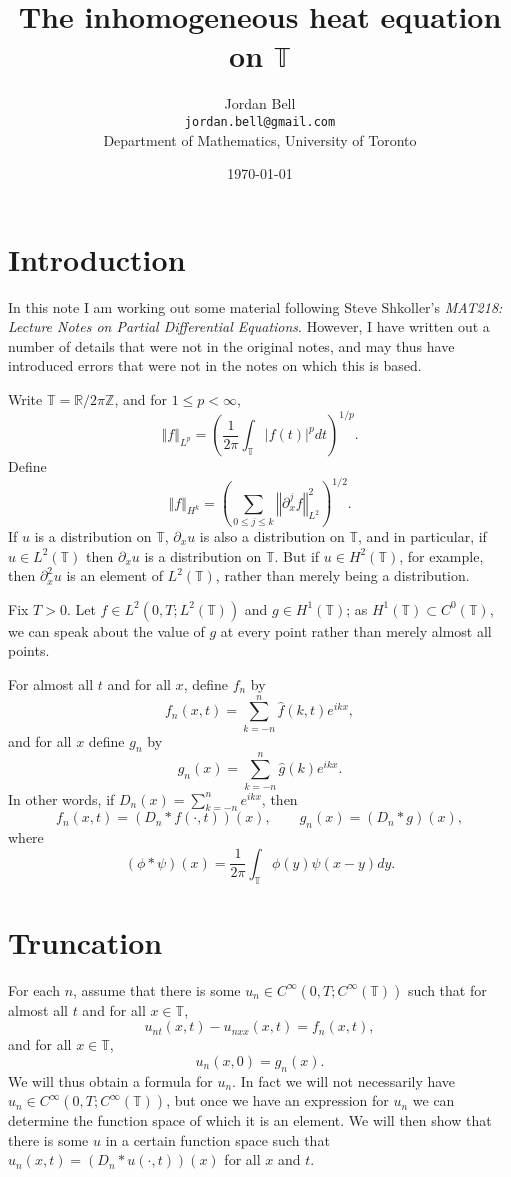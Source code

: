\documentclass{article}
\newcommand{\norm}[1]{\left\Vert #1 \right\Vert}
\begin{document}
\title{The inhomogeneous heat equation on $\mathbb{T}$}
\author{Jordan Bell\\ \texttt{jordan.bell@gmail.com}\\Department of Mathematics, University of Toronto}
\date{\today}

\maketitle
\section{Introduction}
In this note I am working out some material following Steve Shkoller's {\em MAT218: Lecture Notes on Partial Differential Equations}. However, I have written out a number of details that were not in the original notes, and may thus have introduced errors that were not in the notes on which this is
based.

Write
$\mathbb{T}=\mathbb{R}/2\pi \mathbb{Z}$, and
for $1 \leq p < \infty$,
\[
\norm{f}_{L^p}=\left( \frac{1}{2\pi} \int_\mathbb{T} |f(t)|^p dt \right)^{1/p}.
\]
Define
\[
\norm{f}_{H^k}=\left( \sum_{0 \leq j \leq k} \norm{\partial_x^j f}_{L^2}^2 \right)^{1/2}.
\]
If $u$ is a distribution on $\mathbb{T}$, $\partial_x u$ is also a distribution on $\mathbb{T}$, and in particular, if $u \in L^2(\mathbb{T})$ then
$\partial_x u$ is a distribution on $\mathbb{T}$. But if $u \in H^2(\mathbb{T})$, for example, then $\partial_x^2 u$ is an element of  $L^2(\mathbb{T})$, rather than
merely being a distribution.

Fix $T>0$. Let $f \in L^2(0,T;L^2(\mathbb{T}))$ and $g \in H^1(\mathbb{T})$; as $H^1(\mathbb{T}) \subset C^0(\mathbb{T})$, we can
speak about the value of $g$ at every point rather than merely almost all points.

For almost all $t$ and for all $x$, define $f_n$ by
\[
f_n(x,t)=\sum_{k=-n}^n \hat{f}(k,t) e^{ikx},
\]
and for all $x$ define $g_n$ by
\[
g_n(x)=\sum_{k=-n}^n \hat{g}(k) e^{ikx}.
\]
In other words, if $D_n(x)=\sum_{k=-n}^n e^{ikx}$, then
\[
f_n(x,t)=(D_n * f(\cdot,t))(x), \qquad g_n(x)=(D_n * g)(x),
\]
where
\[
(\phi * \psi)(x)=\frac{1}{2\pi} \int_\mathbb{T} \phi(y)\psi(x-y)dy.
\]

\section{Truncation}
For each $n$, assume that there is some $u_n \in C^\infty(0,T; C^\infty(\mathbb{T}))$ such that for almost all $t$ and for  all
$x \in \mathbb{T}$,
\begin{equation}
u_{nt}(x,t)-u_{nxx}(x,t)=f_n(x,t),
\label{npde}
\end{equation}
and for all $x \in \mathbb{T}$,
\[
u_n(x,0)=g_n(x).
\]
We will thus obtain a formula for $u_n$. In fact we will not necessarily have  $u_n \in C^\infty(0,T; C^\infty(\mathbb{T}))$, but once we have
an expression for $u_n$ we can determine the function space of which it is an element. We will then show that there is some $u$ in a certain function
space such that $u_n(x,t)=(D_n * u(\cdot, t))(x)$ for all $x$ and $t$.
\end{document}

